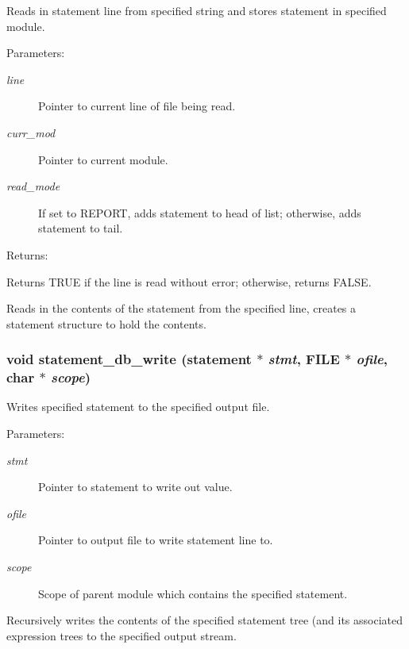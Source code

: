 Reads in statement line from specified string and stores statement in specified module.

\begin{Desc}
\item[Parameters: ]\par
\begin{description}
\item[{\em 
line}]Pointer to current line of file being read. \item[{\em 
curr\_\-mod}]Pointer to current module. \item[{\em 
read\_\-mode}]If set to REPORT, adds statement to head of list; otherwise, adds statement to tail.\end{description}
\end{Desc}
\begin{Desc}
\item[Returns: ]\par
Returns TRUE if the line is read without error; otherwise, returns FALSE.\end{Desc}
Reads in the contents of the statement from the specified line, creates a statement structure to hold the contents. 
\subsubsection{\setlength{\rightskip}{0pt plus 5cm}void statement\_\-db\_\-write ({\bf statement} $\ast$ {\em stmt}, FILE $\ast$ {\em ofile}, char $\ast$ {\em scope})}\label{statement_8c_a5}


Writes specified statement to the specified output file.

\begin{Desc}
\item[Parameters: ]\par
\begin{description}
\item[{\em 
stmt}]Pointer to statement to write out value. \item[{\em 
ofile}]Pointer to output file to write statement line to. \item[{\em 
scope}]Scope of parent module which contains the specified statement.\end{description}
\end{Desc}
Recursively writes the contents of the specified statement tree (and its associated expression trees to the specified output stream. 
